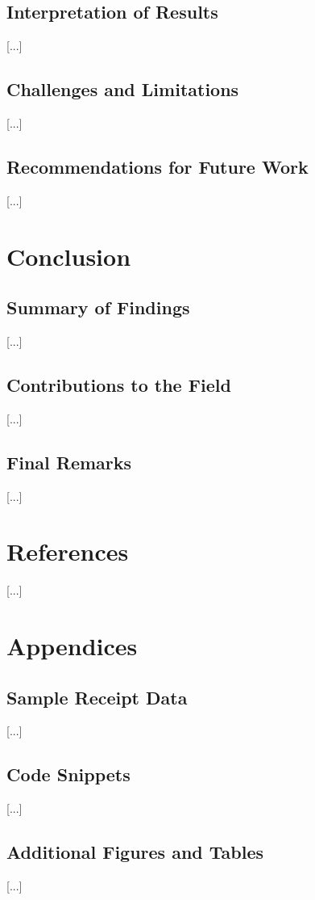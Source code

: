 \documentclass{SGGW-thesis-EN}
\begin{document}
\section{Interpretation of Results}
[...]

\section{Challenges and Limitations}
[...]

\section{Recommendations for Future Work}
[...]

\chapter{Conclusion}

\section{Summary of Findings}
[...]

\section{Contributions to the Field}
[...]

\section{Final Remarks}
[...]

\chapter{References}
[...]

\chapter{Appendices}

\section{Sample Receipt Data}
[...]

\section{Code Snippets}
[...]

\section{Additional Figures and Tables}
[...]
\renewcommand{\bibname}{Bibliography}

\printbibliography

\beforelastpage
\end{document}
